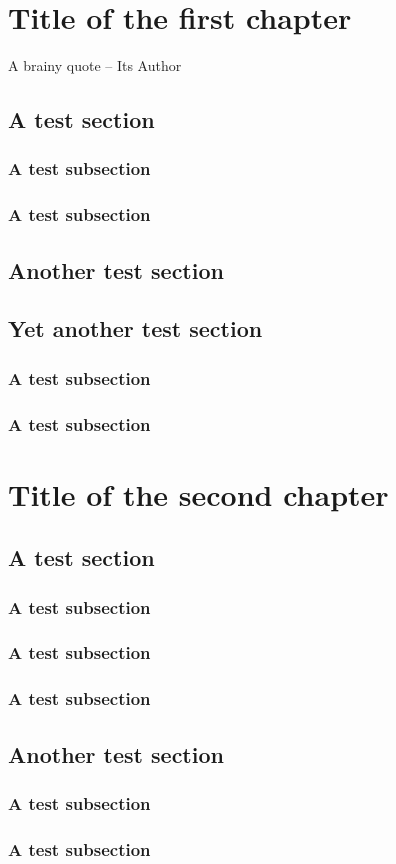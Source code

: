 \documentclass{book}
\newcommand\DoPToC{%
\startcontents[chapters]
\printcontents[chapters]{}{1}{\noindent{\color{myblue}\rule{\textwidth}{1.5pt}}\par\medskip}%
}
\begin{document}
\chapter{Title of the first chapter}
\epigraph{A brainy quote -- Its Author}{}
\DoPToC
\lipsum[4]
\section{A test section}
\lipsum[4]
\subsection{A test subsection}
\lipsum[4]
\subsection{A test subsection}
\lipsum[4]
\section{Another test section}
\lipsum[4]
\section{Yet another test section}
\lipsum[4]
\subsection{A test subsection}
\lipsum[4]
\subsection{A test subsection}
\lipsum[4]

\chapter{Title of the second chapter}
\DoPToC
\lipsum[4]
\section{A test section}
\lipsum[4]
\subsection{A test subsection}
\lipsum[4]
\subsection{A test subsection}
\lipsum[4]
\subsection{A test subsection}
\lipsum[4]
\section{Another test section}
\lipsum[4]
\subsection{A test subsection}
\lipsum[4]
\subsection{A test subsection}
\lipsum[4]
\end{document}
